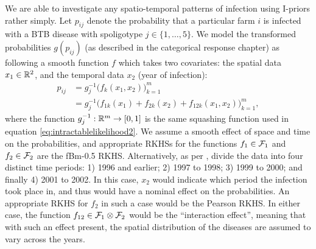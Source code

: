 \documentclass[a4paper,showframe,11pt]{report}\usepackage[]{graphicx}\usepackage[]{color}
\begin{document}
We are able to investigate any spatio-temporal patterns of infection using I-priors rather simply.
Let $p_{ij}$ denote the probability that a particular farm $i$ is infected with a BTB disease with spoligotype $j \in \{1,\dots,5\}$.
We model the transformed probabilities $g(p_{ij})$ (as described in the categorical response chapter) as following a smooth function $f$ which takes two covariates: the spatial data $x_1 \in \mathbb{R}^2$, and the temporal data $x_2$ (year of infection):
\begin{align*}
  p_{ij}
  &= g_j^{-1} \big( f_k(x_1, x_2) \big)_{k=1}^m \\
  &= g_j^{-1} \big( f_{1k}(x_1) + f_{2k}(x_2) + f_{12k}(x_1, x_2) \big)_{k=1}^m,
\end{align*}
where the function $g_j^{-1}:\mathbb{R}^m \to [0,1]$ is the same squashing function used in equation \cref{eq:intractablelikelihood2}.
We assume a smooth effect of space and time on the probabilities, and appropriate RKHSs for the functions $f_1 \in {\mathcal F}_1$ and $f_2 \in {\mathcal F}_2$ are the fBm-0.5 RKHS.
Alternatively, as per \citet{diggle2005nonparametric}, divide the data into four distinct time periods:
1) 1996 and earlier;
2) 1997 to 1998;
3) 1999 to 2000;
and finally 4) 2001 to 2002.
In this case, $x_2$ would indicate which period the infection took place in, and thus would have a nominal effect on the probabilities.
An appropriate RKHS for $f_2$ in such a case would be the Pearson RKHS.
In either case, the function $f_{12} \in {\mathcal F}_1 \otimes {\mathcal F}_2$ would be the ``interaction effect'', meaning that with such an effect present, the spatial distribution of the diseases are assumed to vary across the years.
\end{document}
